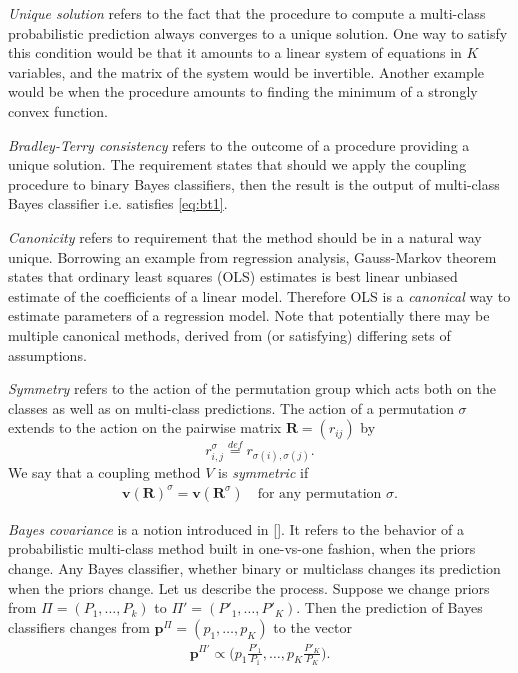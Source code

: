 \documentclass[twoside,11pt]{article}
\begin{document}
\emph{Unique solution} refers to the fact that the procedure to compute a multi-class probabilistic prediction always converges to a unique solution. One way to satisfy this condition would be that it amounts to a linear system of equations in $K$ variables, and the matrix of the system would be invertible. Another example would be when the procedure amounts to finding the minimum of a strongly convex function. 

\emph{Bradley-Terry consistency} refers to the outcome of a procedure providing a unique solution. The requirement states that should we apply the coupling procedure to binary Bayes classifiers, then the result is the output of multi-class Bayes classifier i.e. satisfies \eqref{eq:bt1}.

\emph{Canonicity} refers to requirement that the method should be in a natural way unique. Borrowing an example from regression analysis, Gauss-Markov theorem states that ordinary least squares (OLS) estimates is best linear unbiased estimate of the coefficients of a linear model. Therefore OLS  is a \emph{canonical} way to estimate parameters of a regression model. Note that potentially there may be multiple canonical methods, derived from (or satisfying) differing sets of assumptions. 

\emph{Symmetry} refers to the action of the permutation group which acts both on the classes as well as on multi-class predictions. The action of a permutation $\sigma$ extends to the action on the pairwise matrix $\boldsymbol{R} = (r_{ij})$ by 
\begin{equation}
	 r^\sigma_{i,j} \stackrel{def}{=}  r_{\sigma(i), \sigma(j)}.
\end{equation}
We say that a coupling method $V$ is \emph{symmetric} if 
\begin{align}
		\boldsymbol{v}(\boldsymbol{R})^\sigma = \boldsymbol{v}(\boldsymbol{R}^\sigma)\quad\textrm{for any permutation $\sigma$}.
\end{align}

\emph{Bayes covariance} is a notion introduced in  [\cite{vsuch2016bayes}]. It refers to the behavior of a probabilistic multi-class method built in one-vs-one fashion, when the priors change. Any Bayes classifier, whether binary or multiclass changes its prediction when the priors change. Let us describe the process. Suppose we change priors from $\Pi = (P_1, \ldots, P_k)$ to $\Pi'= (P'_1, \ldots, P'_K)$. Then the prediction of Bayes classifiers changes from $\boldsymbol{p}^\Pi= (p_1, \ldots, p_K)$ to the vector 
\begin{align}
\boldsymbol{p}^{\Pi'} \propto \biggl(p_1 \frac{P'_1}{P_1}, \ldots, p_K \frac{P'_K}{P_K}\biggr). \label{eq:changePrior}
\end{align}
\end{document}
